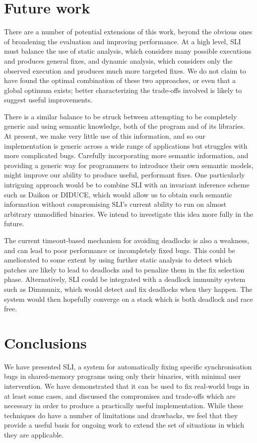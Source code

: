 \documentclass[10pt,twocolumn,preprint,natbib,authoryear]{sigplanconf}
\newcommand{\editorial}[1]{}
\begin{document}
\section{Future work}

There are a number of potential extensions of this work, beyond the
obvious ones of broadening the evaluation and improving performance.
At a high level, SLI must balance the use of static analysis, which
considers many possible executions and produces general fixes, and
dynamic analysis, which considers only the observed execution and
produces much more targeted fixes.  We do not claim to have found the
optimal combination of these two approaches, or even that a global
optimum exists; better characterizing the trade-offs involved is
likely to suggest useful improvements.

There is a similar balance to be struck between attempting to be
completely generic and using semantic knowledge, both of the program
and of its libraries.  At present, we make very little use of this
information, and so our implementation is generic across a wide range
of applications but struggles with more complicated bugs.  Carefully
incorporating more semantic information, and providing a generic way
for programmers to introduce their own semantic models, might improve
our ability to produce useful, performant fixes.  One particularly
intriguing approach would be to combine SLI with an invariant
inference scheme such as Daikon\cite{Ernst2007} or
DIDUCE\cite{Hangal2002}, which would allow us to obtain such semantic
information without compromising SLI's current ability to run on
almost arbitrary unmodified binaries.  We intend to investigate this
idea more fully in the future.

The current timeout-based mechanism for avoiding deadlocks is also a
weakness, and can lead to poor performance or incompletely fixed bugs.
This could be ameliorated to some extent by using further static
analysis to detect which patches are likely to lead to deadlocks and
to penalize them in the fix selection phase.  Alternatively, SLI could
be integrated with a deadlock immunity system such as
Dimmunix\cite{Jula2008}, which would detect and fix deadlocks when
they happen.  The system would then hopefully converge on a stack
which is both deadlock and race free.

\section{Conclusions}

We have presented SLI, a system for automatically fixing specific
synchronisation bugs in shared-memory programs using only their
binaries, with minimal user intervention.  We have demonstrated that
it can be used to fix real-world bugs in at least some cases, and
discussed the compromises and trade-offs which are necessary in order
to produce a practically useful implementation.  While these
techniques do have a number of limitations and drawbacks, we feel that
they provide a useful basis for ongoing work to extend the set of
situations in which they are applicable.\editorial{Wibble wibble
  wibble}




\end{document}
